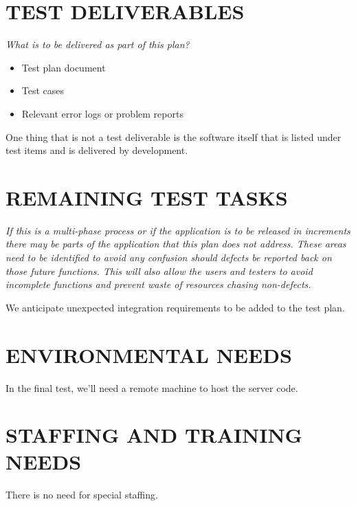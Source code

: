\section[TEST DELIVERABLES]{\bfseries\color{black} TEST DELIVERABLES}
{\itshape\color{black}
What is to be delivered as part of this plan?

\begin{itemize}
\item Test plan document
\item Test cases
\item Relevant error logs or problem reports
\end{itemize}
One thing that is not a test deliverable is the software itself that
is listed under test items and is delivered by development.
}
{\color{black}

  


}

\section[REMAINING TEST TASKS]{\bfseries\color{black} REMAINING TEST TASKS}
{\itshape\color{black}
If this is a multi-phase process or if the application is to be
released in increments there may be parts of the application that this
plan does not address. These areas need to be identified to avoid any
confusion should defects be reported back on those future
functions. This will also allow the users and testers to avoid
incomplete functions and prevent waste of resources chasing non-defects.
}
{\color{black}

  We anticipate unexpected integration requirements to be added to the test plan.

}

\section[ENVIRONMENTAL NEEDS]{\bfseries\color{black} ENVIRONMENTAL NEEDS}
{\color{black}

  In the final test, we'll need a remote machine to host the server code.

}

\section[STAFFING AND TRAINING NEEDS]{\bfseries\color{black}
	 STAFFING AND TRAINING NEEDS}
{\color{black}

  There is no need for special staffing.

}

